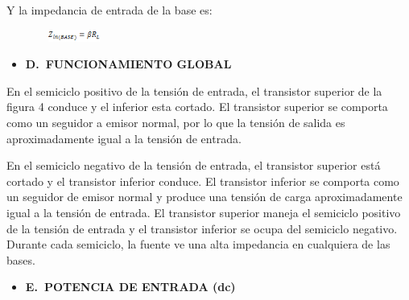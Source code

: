 \documentclass[12pt]{article}
\begin{document}

\par

Y la impedancia de entrada de la base es:\par




\begin{figure}[H]
	\begin{Center}
		\includegraphics[width=0.92in,height=0.15in]{./media/image12.gif}
	\end{Center}
\end{figure}



\par

\begin{itemize}
	\item \textbf{D. FUNCIONAMIENTO GLOBAL}
\end{itemize}\par

En el semiciclo positivo de la tensión de entrada, el transistor superior de la figura 4 conduce y el inferior esta cortado. El transistor superior se comporta como un seguidor a emisor normal, por lo que la tensión de salida es aproximadamente igual a la tensión de entrada.\par

En el semiciclo negativo de la tensión de entrada, el transistor superior está cortado y el transistor inferior conduce. El transistor inferior se comporta como un seguidor de emisor normal y produce una tensión de carga aproximadamente igual a la tensión de entrada. El transistor superior maneja el semiciclo positivo de la tensión de entrada y el transistor inferior se ocupa del semiciclo negativo. Durante cada semiciclo, la fuente ve una alta impedancia en cualquiera de las bases.\par

\begin{itemize}
	\item \textbf{E. POTENCIA DE ENTRADA (dc)}
\end{itemize}\par
\end{document}
